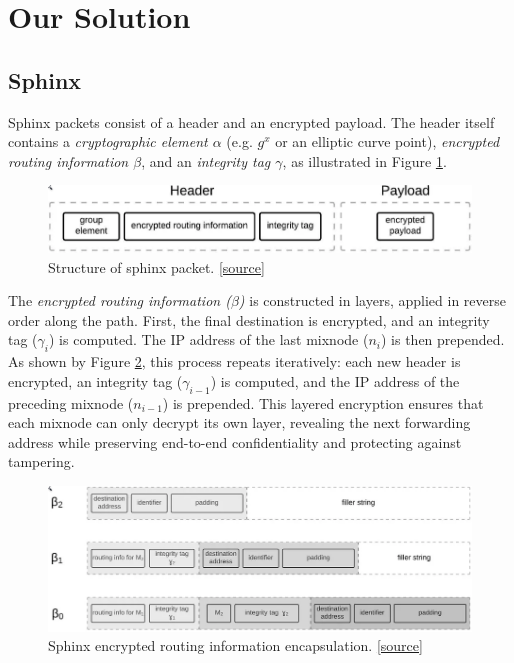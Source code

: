 \section{Our Solution}\label{sec:scheme}
\subsection{Sphinx}
Sphinx packets consist of a header and an encrypted payload. 
The header itself contains a \textit{cryptographic element $\alpha$} (e.g. $g^x$ or an elliptic curve point), \textit{encrypted routing information $\beta$}, and an \textit{integrity tag $\gamma$}, as illustrated in Figure \ref{fig:sphinx_structure}.

\begin{figure}[h]
    \centering
    \includegraphics[width=0.9\linewidth]{Images/sphinx_structure.png}
    \caption{Structure of sphinx packet. \href{https://blog.nymtech.net/sphinx-tl-dr-the-data-packet-that-can-anonymize-bitcoin-and-the-internet-18d152c6e4dc}{[source]}}
    \label{fig:sphinx_structure}
\end{figure}

The \textit{encrypted routing information ($\beta$)} is constructed in layers, applied in reverse order along the path.
First, the final destination is encrypted, and an integrity tag ($\gamma_i$) is computed. 
The IP address of the last mixnode ($n_i$) is then prepended.
As shown by Figure \ref{fig:sphinx_header}, this process repeats iteratively: each new header is encrypted, an integrity tag ($\gamma_{i-1}$) is computed, and the IP address of the preceding mixnode ($n_{i-1}$) is prepended.
This layered encryption ensures that each mixnode can only decrypt its own layer, revealing the next forwarding address while preserving end-to-end confidentiality and protecting against tampering.

\begin{figure}[h]
    \centering
    \includegraphics[width=\linewidth]{Images/sphinx_header.png}
    \caption{Sphinx encrypted routing information encapsulation. \href{https://blog.nymtech.net/sphinx-tl-dr-the-data-packet-that-can-anonymize-bitcoin-and-the-internet-18d152c6e4dc}{[source]}}
    \label{fig:sphinx_header}
\end{figure}

